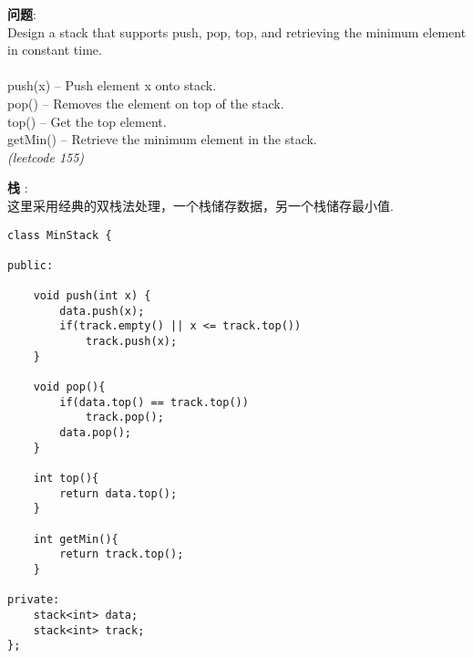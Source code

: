     
\begin{description}
    \item{\textbf{问题}}:\\
Design a stack that supports push, pop, top, and retrieving the minimum element in constant time.\\
\\
push(x) -- Push element x onto stack.\\
pop() -- Removes the element on top of the stack.\\
top() -- Get the top element.\\
getMin() -- Retrieve the minimum element in the stack.\\
 \textit{(leetcode 155)}
    \item{\textbf{栈}} : 
    \\这里采用经典的双栈法处理，一个栈储存数据，另一个栈储存最小值.
    \begin{lstlisting}
class MinStack {

public:

	void push(int x) {
		data.push(x);
		if(track.empty() || x <= track.top())
			track.push(x);
    }

    void pop(){
		if(data.top() == track.top())
			track.pop();
		data.pop();
    }

    int top(){
		return data.top();
    }

    int getMin(){
		return track.top();
    }

private:
	stack<int> data;
	stack<int> track;
};
    \end{lstlisting}
\end{description}
